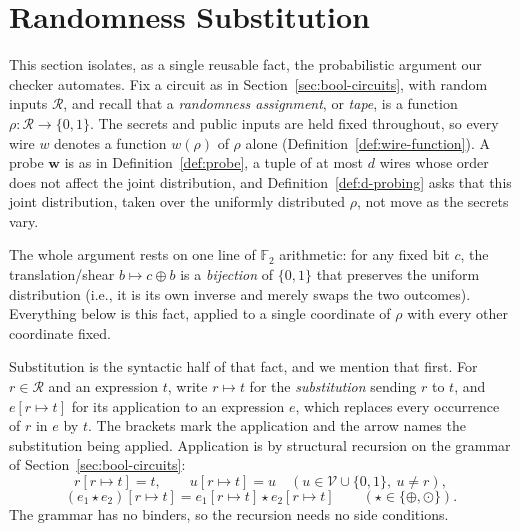 
\section{Randomness Substitution}
\label{sec:randomness-substitution}

This section isolates, as a single reusable fact, the probabilistic argument
our checker automates. Fix a circuit as in Section~\ref{sec:bool-circuits},
with random inputs $\mathcal{R}$, and recall that a \emph{randomness assignment},
or \emph{tape}, is a function $\rho : \mathcal{R} \to \{0,1\}$. The secrets and public
inputs are held fixed throughout, so every wire $w$ denotes a function $w(\rho)$ of
$\rho$ alone (Definition~\ref{def:wire-function}). A probe $\mathbf{w}$ is as in
Definition~\ref{def:probe}, a tuple of at most $d$ wires whose order does not
affect the joint distribution, and Definition~\ref{def:d-probing} asks that this
joint distribution, taken over the uniformly distributed $\rho$, not move as the
secrets vary.

The whole argument rests on one line of $\mathbb{F}_2$ arithmetic: for any fixed
bit $c$, the translation/shear $b \mapsto c \oplus b$ is a \emph{bijection} of $\{0,1\}$
that preserves the uniform distribution (i.e., it is its own inverse and merely swaps
the two outcomes). Everything below is this fact, applied to a single coordinate
of $\rho$ with every other coordinate fixed.

Substitution is the syntactic half of that fact, and we mention that first. For
$r \in \mathcal{R}$ and an expression $t$, write $r \mapsto t$ for the
\emph{substitution} sending $r$ to $t$, and $e[r \mapsto t]$ for its application
to an expression $e$, which replaces every occurrence of $r$ in $e$ by $t$. The
brackets mark the application and the arrow names the substitution being applied.
Application is by structural recursion on the grammar of
Section~\ref{sec:bool-circuits}:
\[
  r[r \mapsto t] = t, \qquad
  u[r \mapsto t] = u \quad (u \in \mathcal{V} \cup \{0,1\},\ u \neq r),
\]
\[
  (e_1 \star e_2)[r \mapsto t] = e_1[r \mapsto t] \star e_2[r \mapsto t]
  \qquad (\star \in \{\oplus, \odot\}) .
\]
The grammar has no binders, so the recursion needs no side conditions.

